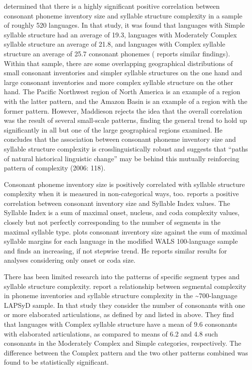   \citet{Maddieson2006} determined that there is a highly significant positive correlation between consonant phoneme inventory size and syllable structure complexity in a sample of roughly 520 languages. In that study, it was found that languages with Simple syllable structure had an average of 19.3, languages with Moderately Complex syllable structure an average of 21.8, and languages with Complex syllable structure an average of 25.7 consonant phonemes (\citealt{Maddieson2013a} reports similar findings). Within that sample, there are some overlapping geographical distributions of small consonant inventories and simpler syllable structures on the one hand and large consonant inventories and more complex syllable structure on the other hand. The Pacific Northwest region of North America is an example of a region with the latter pattern, and the Amazon Basin is an example of a region with the former pattern. However, Maddieson rejects the idea that the overall correlation was the result of several small-scale patterns, finding the general trend to hold up significantly in all but one of the large geographical regions examined. He concludes that the association between consonant phoneme inventory size and syllable structure complexity is crosslinguistically robust and suggests that “paths of natural historical linguistic change” may be behind this mutually reinforcing pattern of complexity (2006: 118). 

  Consonant phoneme inventory size is positively correlated with syllable structure complexity when it is measured in non-categorical ways, too. \citet{Maddieson2011} reports a positive correlation between consonant inventory size and Syllable Index values. The Syllable Index is a sum of maximal onset, nucleus, and coda complexity values, closely but not perfectly corresponding to the number of segments in the maximal syllable type. \citet{Gordon2016} plots consonant inventory size against the sum of maximal syllable margins for each language in the modified WALS 100-language sample and finds an increasing, if not stepwise trend. He reports similar results for analyses considering only onset or coda size.

  There has been limited research into the patterns of specific segment types and syllable structure complexity. \citet{MaddiesonEtAl2013} report a relationship between segmental complexity in phoneme inventories and syllable structure complexity in the {\textasciitilde}700-language LAPSyD sample. In that study they consider the number of consonants with one or more elaborated articulations, as defined by \citet{LindblomMaddieson1988} and listed in  above. They find that languages with Complex syllable structure have a mean of 9.6 consonants with elaborated articulations, as compared to means of 6.2 and 4.8 such consonants in the Moderately Complex and Simple categories, respectively. The difference between the Complex pattern and the two other patterns combined was found to be statistically significant.


